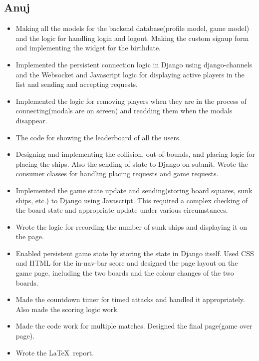 \documentclass[titlepage]{article}
\begin{document}
\subsection{Anuj}
    \begin{itemize}
        \item Making all the models for the backend database(profile model, game model) and the logic for handling login and logout. Making the custom signup form and implementing the widget for the birthdate.
        \item Implemented the persistent connection logic in Django using django-channels and the Websocket and Javascript logic for displaying active players in the list and sending and accepting requests.
        \item Implemented the logic for removing players when they are in the process of connecting(modals are on screen) and readding them when the modals disappear.
        \item The code for showing the leaderboard of all the users.
        \item Designing and implementing the collision, out-of-bounds, and placing logic for placing the ships. Also the sending of state to Django on submit. Wrote the consumer classes for handling placing requests and game requests.
        \item Implemented the game state update and sending(storing board squares, sunk ships, etc.) to Django using Javascript.
        This required a complex checking of the board state and appropriate update under various circumstances.
        \item Wrote the logic for recording the number of sunk ships and displaying it on the page.
        \item Enabled persistent game state by storing the state in Django itself. Used CSS and HTML for the in-nav-bar score and designed the page layout on the game page, including the two boards and the colour changes of the two boards.
        \item Made the countdown timer for timed attacks and handled it appropriately. Also made the scoring logic work.
        \item Made the code work for multiple matches. Designed the final page(game over page).
        \item Wrote the \LaTeX \ report.
    \end{itemize}
\end{document}
